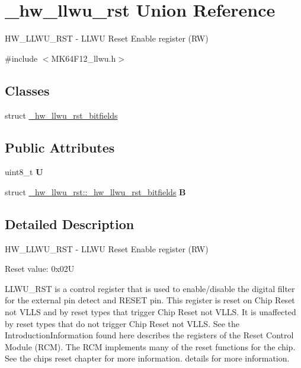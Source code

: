 \hypertarget{union__hw__llwu__rst}{}\section{\+\_\+hw\+\_\+llwu\+\_\+rst Union Reference}
\label{union__hw__llwu__rst}


H\+W\+\_\+\+L\+L\+W\+U\+\_\+\+R\+ST -\/ L\+L\+WU Reset Enable register (RW)  




{\ttfamily \#include $<$M\+K64\+F12\+\_\+llwu.\+h$>$}

\subsection*{Classes}
\begin{DoxyCompactItemize}
\item 
struct \hyperlink{struct__hw__llwu__rst_1_1__hw__llwu__rst__bitfields}{\+\_\+hw\+\_\+llwu\+\_\+rst\+\_\+bitfields}
\end{DoxyCompactItemize}
\subsection*{Public Attributes}
\begin{DoxyCompactItemize}
\item 
uint8\+\_\+t {\bfseries U}\hypertarget{union__hw__llwu__rst_a1ce9dda46be8f4a603e390db6caa133d}{}\label{union__hw__llwu__rst_a1ce9dda46be8f4a603e390db6caa133d}

\item 
struct \hyperlink{struct__hw__llwu__rst_1_1__hw__llwu__rst__bitfields}{\+\_\+hw\+\_\+llwu\+\_\+rst\+::\+\_\+hw\+\_\+llwu\+\_\+rst\+\_\+bitfields} {\bfseries B}\hypertarget{union__hw__llwu__rst_a2b46b9895aa572a084544c1e6b2b31c0}{}\label{union__hw__llwu__rst_a2b46b9895aa572a084544c1e6b2b31c0}

\end{DoxyCompactItemize}


\subsection{Detailed Description}
H\+W\+\_\+\+L\+L\+W\+U\+\_\+\+R\+ST -\/ L\+L\+WU Reset Enable register (RW) 

Reset value\+: 0x02U

L\+L\+W\+U\+\_\+\+R\+ST is a control register that is used to enable/disable the digital filter for the external pin detect and R\+E\+S\+ET pin. This register is reset on Chip Reset not V\+L\+LS and by reset types that trigger Chip Reset not V\+L\+LS. It is unaffected by reset types that do not trigger Chip Reset not V\+L\+LS. See the Introduction\+Information found here describes the registers of the Reset Control Module (R\+CM). The R\+CM implements many of the reset functions for the chip. See the chip\textquotesingle{}s reset chapter for more information. details for more information. 

